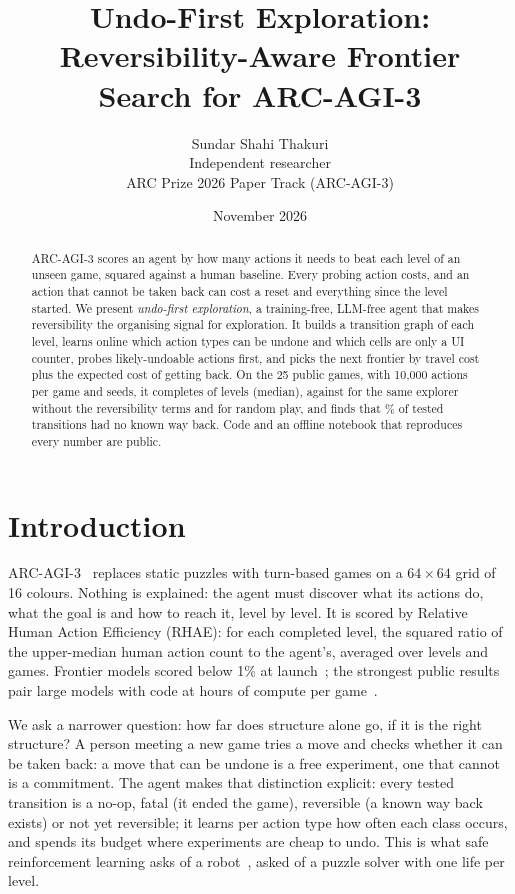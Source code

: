 \documentclass[10pt]{article}
\title{Undo-First Exploration: Reversibility-Aware Frontier Search for ARC-AGI-3}
\author{Sundar Shahi Thakuri\\ Independent researcher \\ \small ARC Prize 2026 Paper Track (ARC-AGI-3)}
\date{November 2026}
\begin{document}
\maketitle

\begin{abstract}
ARC-AGI-3 scores an agent by how many actions it needs to beat each level of an unseen game, squared against a human baseline. Every probing action costs, and an action that cannot be taken back can cost a reset and everything since the level started. We present \emph{undo-first exploration}, a training-free, LLM-free agent that makes reversibility the organising signal for exploration. It builds a transition graph of each level, learns online which action types can be undone and which cells are only a UI counter, probes likely-undoable actions first, and picks the next frontier by travel cost plus the expected cost of getting back. On the 25 public games, with 10{,}000 actions per game and \nSeeds{} seeds, it completes \undoLevels{} of \totalLevels{} levels (median), against \frontierLevels{} for the same explorer without the reversibility terms and \randomLevels{} for random play, and finds that \shareirreversible\% of tested transitions had no known way back. Code and an offline notebook that reproduces every number are public.
\end{abstract}

\section{Introduction}
ARC-AGI-3~\cite{arc3} replaces static puzzles with turn-based games on a $64{\times}64$ grid of 16 colours. Nothing is explained: the agent must discover what its actions do, what the goal is and how to reach it, level by level. It is scored by Relative Human Action Efficiency (RHAE): for each completed level, the squared ratio of the upper-median human action count to the agent's, averaged over levels and games. Frontier models scored below 1\% at launch~\cite{arc3}; the strongest public results pair large models with code at hours of compute per game~\cite{ewm}.

We ask a narrower question: how far does structure alone go, if it is the right structure? A person meeting a new game tries a move and checks whether it can be taken back: a move that can be undone is a free experiment, one that cannot is a commitment. The agent makes that distinction explicit: every tested transition is a no-op, fatal (it ended the game), reversible (a known way back exists) or not yet reversible; it learns per action type how often each class occurs, and spends its budget where experiments are cheap to undo. This is what safe reinforcement learning asks of a robot~\cite{noturningback,leavenotrace}, asked of a puzzle solver with one life per level.
\end{document}
